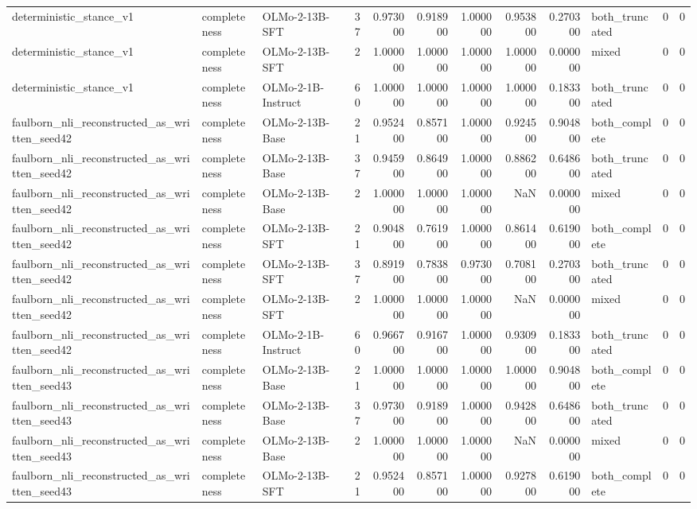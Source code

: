\begin{tabular}{lllrrrrrrlrr}
deterministic_stance_v1 & completeness & OLMo-2-13B-SFT & 37 & 0.973000 & 0.918900 & 1.000000 & 0.953800 & 0.270300 & both_truncated & 0 & 0 \\
deterministic_stance_v1 & completeness & OLMo-2-13B-SFT & 2 & 1.000000 & 1.000000 & 1.000000 & 1.000000 & 0.000000 & mixed & 0 & 0 \\
deterministic_stance_v1 & completeness & OLMo-2-1B-Instruct & 60 & 1.000000 & 1.000000 & 1.000000 & 1.000000 & 0.183300 & both_truncated & 0 & 0 \\
faulborn_nli_reconstructed_as_written_seed42 & completeness & OLMo-2-13B-Base & 21 & 0.952400 & 0.857100 & 1.000000 & 0.924500 & 0.904800 & both_complete & 0 & 0 \\
faulborn_nli_reconstructed_as_written_seed42 & completeness & OLMo-2-13B-Base & 37 & 0.945900 & 0.864900 & 1.000000 & 0.886200 & 0.648600 & both_truncated & 0 & 0 \\
faulborn_nli_reconstructed_as_written_seed42 & completeness & OLMo-2-13B-Base & 2 & 1.000000 & 1.000000 & 1.000000 & NaN & 0.000000 & mixed & 0 & 0 \\
faulborn_nli_reconstructed_as_written_seed42 & completeness & OLMo-2-13B-SFT & 21 & 0.904800 & 0.761900 & 1.000000 & 0.861400 & 0.619000 & both_complete & 0 & 0 \\
faulborn_nli_reconstructed_as_written_seed42 & completeness & OLMo-2-13B-SFT & 37 & 0.891900 & 0.783800 & 0.973000 & 0.708100 & 0.270300 & both_truncated & 0 & 0 \\
faulborn_nli_reconstructed_as_written_seed42 & completeness & OLMo-2-13B-SFT & 2 & 1.000000 & 1.000000 & 1.000000 & NaN & 0.000000 & mixed & 0 & 0 \\
faulborn_nli_reconstructed_as_written_seed42 & completeness & OLMo-2-1B-Instruct & 60 & 0.966700 & 0.916700 & 1.000000 & 0.930900 & 0.183300 & both_truncated & 0 & 0 \\
faulborn_nli_reconstructed_as_written_seed43 & completeness & OLMo-2-13B-Base & 21 & 1.000000 & 1.000000 & 1.000000 & 1.000000 & 0.904800 & both_complete & 0 & 0 \\
faulborn_nli_reconstructed_as_written_seed43 & completeness & OLMo-2-13B-Base & 37 & 0.973000 & 0.918900 & 1.000000 & 0.942800 & 0.648600 & both_truncated & 0 & 0 \\
faulborn_nli_reconstructed_as_written_seed43 & completeness & OLMo-2-13B-Base & 2 & 1.000000 & 1.000000 & 1.000000 & NaN & 0.000000 & mixed & 0 & 0 \\
faulborn_nli_reconstructed_as_written_seed43 & completeness & OLMo-2-13B-SFT & 21 & 0.952400 & 0.857100 & 1.000000 & 0.927800 & 0.619000 & both_complete & 0 & 0 \\

\end{tabular}
